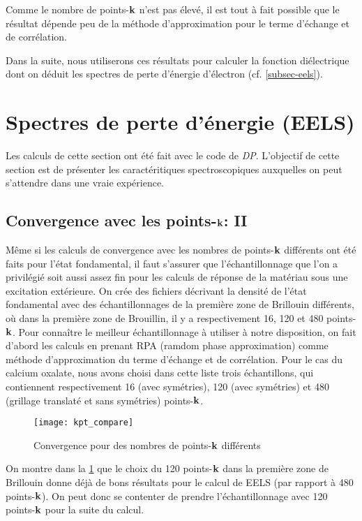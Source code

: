Comme le nombre de points-$\vb{k}$ n'est pas élevé,
il est tout à fait possible que le résultat dépende peu de la méthode d'approximation
pour le terme d'échange et de corrélation.

Dans la suite, nous utiliserons ces résultats pour calculer la fonction diélectrique
dont on déduit les spectres de perte d'énergie d'électron (cf. \cref{subsec-eels}).

\section{Spectres de perte d'énergie (EELS)}
Les calculs de cette section ont été fait avec le code de \textit{DP}.
L'objectif de cette section est de présenter les caractéritiques spectroscopiques
auxquelles on peut s'attendre dans une vraie expérience.

\subsection{Convergence avec les points-$\vb{k}$: II}
Même si les calculs de convergence avec les nombres de points-$\vb{k}$ différents ont été faits pour l'état fondamental,
il faut s'assurer que l'échantillonnage que l'on a privilégié soit aussi assez fin pour les calculs de réponse de la matériau sous une excitation extérieure.
On crée des fichiers décrivant la densité de l'état fondamental avec des échantillonnages
de la première zone de Brillouin différents,
où dans la première zone de Brouillin, il y a respectivement 16, 120 et 480 points-$\vb{k}$.
Pour connaître le meilleur échantillonnage à utiliser à notre disposition,
on fait d'abord les calculs en prenant RPA (ramdom phase approximation)
comme méthode d'approximation du terme d'échange et de corrélation.
Pour le cas du calcium oxalate, nous avons choisi dans cette liste trois échantillons,
qui contiennent respectivement 16 (avec symétries),
120 (avec symétries) et 480 (grillage translaté et sans symétries) points-$\vb{k}$.
\begin{figure}[!h]
    \centering
    \texttt{[image: kpt\_compare]}
    \caption{Convergence pour des nombres de points-$\vb{k}$ différents}\label{fig-kptCompare}
\end{figure}

On montre dans la \cref{fig-kptCompare} que le choix du 120 points-$\vb{k}$ dans la première zone de Brillouin
donne déjà de bons résultats pour le calcul de EELS (par rapport à 480 points-$\vb{k}$).
On peut donc se contenter de prendre l'échantillonnage avec 120 points-$\vb{k}$ pour la suite du calcul.

